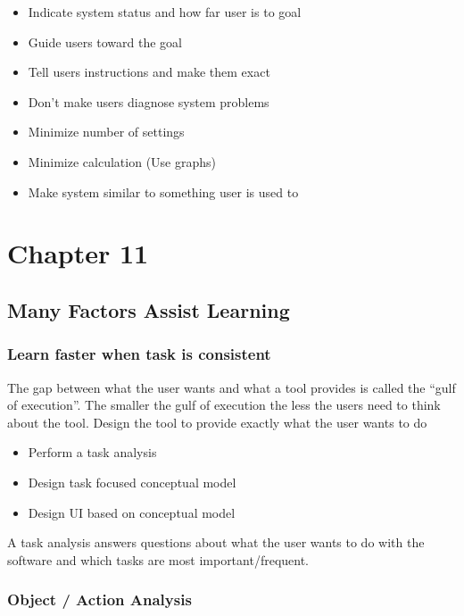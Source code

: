 \documentclass[11pt,]{article}
\begin{document}
\begin{itemize}
\item
  Indicate system status and how far user is to goal
\item
  Guide users toward the goal
\item
  Tell users instructions and make them exact
\item
  Don't make users diagnose system problems
\item
  Minimize number of settings
\item
  Minimize calculation (Use graphs)
\item
  Make system similar to something user is used to
\end{itemize}

\hypertarget{chapter-11}{%
\section{Chapter 11}\label{chapter-11}}

\hypertarget{many-factors-assist-learning}{%
\subsection{Many Factors Assist
Learning}\label{many-factors-assist-learning}}

\hypertarget{learn-faster-when-task-is-consistent}{%
\subsubsection{Learn faster when task is
consistent}\label{learn-faster-when-task-is-consistent}}

The gap between what the user wants and what a tool provides is called
the ``gulf of execution''. The smaller the gulf of execution the less
the users need to think about the tool. Design the tool to provide
exactly what the user wants to do

\begin{itemize}
\item
  Perform a task analysis
\item
  Design task focused conceptual model
\item
  Design UI based on conceptual model
\end{itemize}

A task analysis answers questions about what the user wants to do with
the software and which tasks are most important/frequent.

\hypertarget{object-action-analysis}{%
\subsubsection{Object / Action Analysis}\label{object-action-analysis}}
\end{document}
